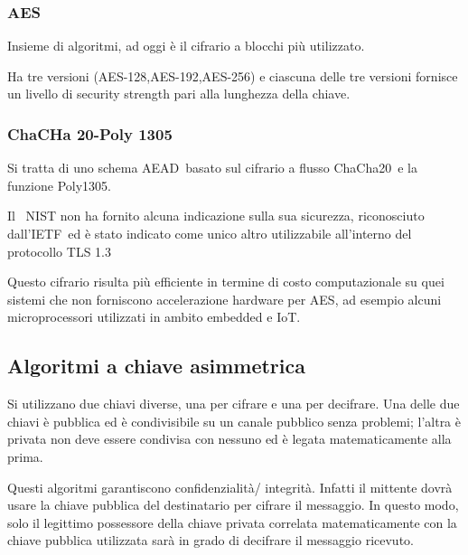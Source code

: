 \documentclass[
]{article}
\begin{document}
\subsubsection{\texorpdfstring{{AES}}{AES}}\label{h.43fmfqryogku}

{Insieme di algoritmi, ad oggi è il cifrario a blocchi più utilizzato.}

{Ha tre versioni (AES-128,AES-192,AES-256) e ciascuna delle tre versioni
fornisce un livello di security strength pari alla lunghezza della
chiave.}

\subsubsection{\texorpdfstring{{ChaCHa 20-Poly
1305}}{ChaCHa 20-Poly 1305}}\label{h.jebp9712ao7w}

{Si tratta di uno schema }{AEAD}{~basato sul cifrario a flusso
}{ChaCha20}{~e la funzione }{Poly1305.}{~}

{}

{Il ~NIST non ha fornito alcuna indicazione sulla sua sicurezza,
riconosciuto }{dall'IETF}{~ed è stato indicato come unico altro
utilizzabile all'interno del protocollo TLS 1.3 }

{}

{Questo cifrario risulta più efficiente in termine di costo
computazionale su quei sistemi che non forniscono accelerazione hardware
per AES, ad esempio alcuni microprocessori utilizzati in ambito embedded
e IoT. }

\subsection{\texorpdfstring{{Algoritmi a chiave
asimmetrica}}{Algoritmi a chiave asimmetrica}}\label{h.3tln7xajl0nk}

{Si utilizzano due chiavi diverse, una per cifrare e una per decifrare.
Una delle due chiavi è pubblica ed è condivisibile su un canale pubblico
senza problemi; l'altra è privata non deve essere condivisa con nessuno
ed è legata matematicamente alla prima.}

{}

{Questi algoritmi garantiscono confidenzialità/ integrità. Infatti il
mittente dovrà usare la chiave pubblica del destinatario per cifrare il
messaggio. In questo modo, solo il legittimo possessore della chiave
privata correlata matematicamente con la chiave pubblica utilizzata sarà
in grado di decifrare il messaggio ricevuto. }
\end{document}
